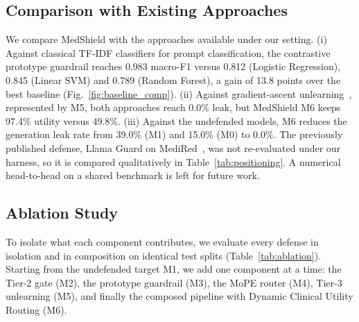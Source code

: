 \documentclass[lettersize,journal]{IEEEtran}
\begin{document}
\subsection{Comparison with Existing Approaches}
We compare MedShield with the approaches available under our setting. (i) Against classical TF-IDF classifiers for prompt classification, the contrastive prototype guardrail reaches 0.983 macro-F1 versus 0.812 (Logistic Regression), 0.845 (Linear SVM) and 0.789 (Random Forest), a gain of 13.8 points over the best baseline (Fig.~\ref{fig:baseline_comp}). (ii) Against gradient-ascent unlearning~\cite{golatkar2020}, represented by M5, both approaches reach 0.0\% leak, but MedShield M6 keeps 97.4\% utility versus 49.8\%. (iii) Against the undefended models, M6 reduces the generation leak rate from 39.0\% (M1) and 15.0\% (M0) to 0.0\%. The previously published defense, Llama Guard on MediRed~\cite{kang2025, inan2023}, was not re-evaluated under our harness, so it is compared qualitatively in Table~\ref{tab:positioning}. A numerical head-to-head on a shared benchmark is left for future work.

\subsection{Ablation Study}
\label{sec:ablation}
To isolate what each component contributes, we evaluate every defense in isolation and in composition on identical test splits (Table~\ref{tab:ablation}). Starting from the undefended target M1, we add one component at a time: the Tier-2 gate (M2), the prototype guardrail (M3), the MoPE router (M4), Tier-3 unlearning (M5), and finally the composed pipeline with Dynamic Clinical Utility Routing (M6).
\end{document}
